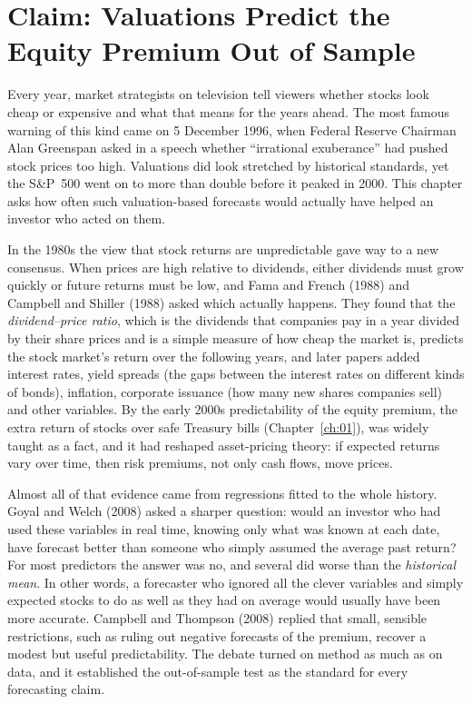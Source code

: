 \makeatletter
\makeatother

\chapter{Claim: Valuations Predict the Equity Premium Out of Sample}
\label{ch:06}
\providecommand{\term}[1]{\emph{#1}}

Every year, market strategists on television tell viewers whether stocks look cheap or expensive and what that means for the years ahead. The most famous warning of this kind came on 5 December 1996, when Federal Reserve Chairman Alan Greenspan asked in a speech whether ``irrational exuberance'' had pushed stock prices too high. Valuations did look stretched by historical standards, yet the S\&P~500 went on to more than double before it peaked in 2000. This chapter asks how often such valuation-based forecasts would actually have helped an investor who acted on them.

In the 1980s the view that stock returns are unpredictable gave way to a new consensus. When prices are high relative to dividends, either dividends must grow quickly or future returns must be low, and Fama and French (1988) and Campbell and Shiller (1988) asked which actually happens. They found that the \term{dividend--price ratio}, which is the dividends that companies pay in a year divided by their share prices and is a simple measure of how cheap the market is, predicts the stock market's return over the following years, and later papers added interest rates, yield spreads (the gaps between the interest rates on different kinds of bonds), inflation, corporate issuance (how many new shares companies sell) and other variables. By the early 2000s predictability of the equity premium, the extra return of stocks over safe Treasury bills (Chapter~\ref{ch:01}), was widely taught as a fact, and it had reshaped asset-pricing theory: if expected returns vary over time, then risk premiums, not only cash flows, move prices.

Almost all of that evidence came from regressions fitted to the whole history. Goyal and Welch (2008) asked a sharper question: would an investor who had used these variables in real time, knowing only what was known at each date, have forecast better than someone who simply assumed the average past return? For most predictors the answer was no, and several did worse than the \term{historical mean}. In other words, a forecaster who ignored all the clever variables and simply expected stocks to do as well as they had on average would usually have been more accurate. Campbell and Thompson (2008) replied that small, sensible restrictions, such as ruling out negative forecasts of the premium, recover a modest but useful predictability. The debate turned on method as much as on data, and it established the out-of-sample test as the standard for every forecasting claim.

